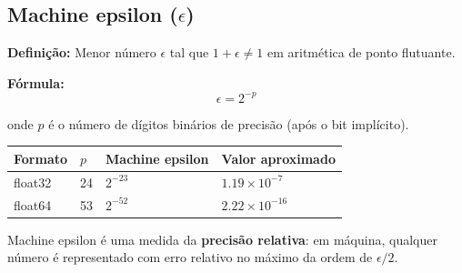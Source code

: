 \documentclass[
  11pt,
  letterpaper,
  DIV=11,
  numbers=noendperiod]{scrartcl}
\newcounter{none} %
\begin{document}
\subsection{\texorpdfstring{Machine epsilon
(\(\epsilon\))}{Machine epsilon (\textbackslash epsilon)}}\label{machine-epsilon-epsilon}

\textbf{Definição:} Menor número \(\epsilon\) tal que
\(1 + \epsilon \neq 1\) em aritmética de ponto flutuante.

\textbf{Fórmula:} \[\epsilon = 2^{-p}\]

onde \(p\) é o número de dígitos binários de precisão (após o bit
implícito).

{\def\LTcaptype{none} %
\begin{longtable}[]{@{}llll@{}}
\toprule\noalign{}
Formato & \(p\) & Machine epsilon & Valor aproximado \\
\midrule\noalign{}
\endhead
\bottomrule\noalign{}
\endlastfoot
float32 & 24 & \(2^{-23}\) & \(1.19 \times 10^{-7}\) \\
float64 & 53 & \(2^{-52}\) & \(2.22 \times 10^{-16}\) \\
\end{longtable}
}

\begin{tcolorbox}[enhanced jigsaw, arc=.35mm, bottomrule=.15mm, bottomtitle=1mm, breakable, colback=white, colbacktitle=quarto-callout-warning-color!10!white, colframe=quarto-callout-warning-color-frame, coltitle=black, left=2mm, leftrule=.75mm, opacityback=0, opacitybacktitle=0.6, rightrule=.15mm, title=\textcolor{quarto-callout-warning-color}{\faExclamationTriangle}\hspace{0.5em}{Interpretação}, titlerule=0mm, toprule=.15mm, toptitle=1mm]

Machine epsilon é uma medida da \textbf{precisão relativa}: em máquina,
qualquer número é representado com erro relativo no máximo da ordem de
\(\epsilon / 2\).

\end{tcolorbox}
\end{document}
